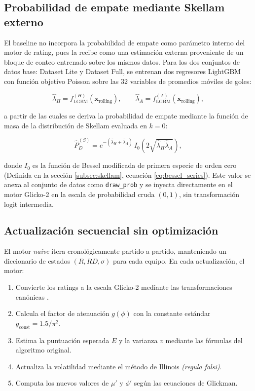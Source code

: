 \subsection{Probabilidad de empate mediante Skellam externo}

El baseline no incorpora la probabilidad de empate como par\'ametro interno del motor de rating, pues la recibe como una estimaci\'on externa proveniente de un bloque de conteo entrenado sobre los mismos datos. Para los dos conjuntos de datos base: Dataset Lite y Dataset Full, se entrenan dos regresores LightGBM con funci\'on objetivo Poisson \cite{ke2017lightgbm} sobre las 32 variables de promedios m\'oviles de goles:

\begin{equation}
	\hat{\lambda}_H = f_{\text{LGBM}}^{(H)}(\mathbf{x}_{\text{rolling}}), \qquad
	\hat{\lambda}_A = f_{\text{LGBM}}^{(A)}(\mathbf{x}_{\text{rolling}}),
\end{equation}

a partir de las cuales se deriva la probabilidad de empate mediante la funci\'on de masa de la distribuci\'on de Skellam evaluada en $k=0$:

\begin{equation}
	\hat{P}_D^{(S)} = e^{-(\hat{\lambda}_H + \hat{\lambda}_A)} \, I_0\!\left(2\sqrt{\hat{\lambda}_H \hat{\lambda}_A}\right),
	\label{eq:skellam_draw_baseline_app}
\end{equation}

donde $I_0$ es la funci\'on de Bessel modificada de primera especie de orden cero (Definida en la secci\'on \ref{subsec:skellam}, ecuaci\'on \ref{eq:bessel_series}). Este valor se anexa al conjunto de datos como \texttt{draw\_prob} y se inyecta directamente en el motor Glicko-2 en la escala de probabilidad cruda $(0,1)$, sin transformaci\'on logit intermedia.

\subsection{Actualizaci\'on secuencial sin optimizaci\'on}

El motor \textit{naive} itera cronol\'ogicamente partido a partido, manteniendo un diccionario de estados $(R, RD, \sigma)$ para cada equipo. En cada actualizaci\'on, el motor:
\begin{enumerate}
	\item Convierte los ratings a la escala Glicko-2 mediante las transformaciones can\'onicas \cite{Glickman2022}.
	\item Calcula el factor de atenuaci\'on $g(\phi)$ con la constante est\'andar $g_{\text{const}} = 1.5/\pi^2$.
	\item Estima la puntuaci\'on esperada $E$ y la varianza $v$ mediante las f\'ormulas del algoritmo original.
	\item Actualiza la volatilidad mediante el m\'etodo de Illinois \textit{(regula falsi)}.
	\item Computa los nuevos valores de $\mu'$ y $\phi'$ seg\'un las ecuaciones de Glickman.
\end{enumerate}

